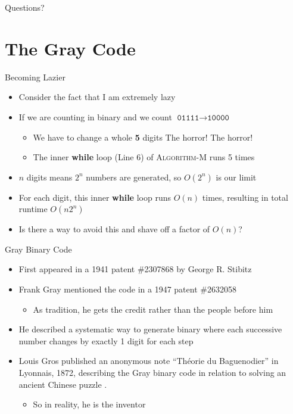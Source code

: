\documentclass[aspectratio=169]{beamer}
\begin{document}
\begin{frame}{}
      \begin{center}
    {\color{sigma@mainblue} \LARGE Questions?}
  \end{center}
\end{frame}

\section{The Gray Code}
\frame{\sectionpage}

\begin{frame}{Becoming Lazier}
    \begin{itemize}
        \item Consider the fact that I am extremely lazy \pause
        \item If we are counting in binary and we count $\texttt{01111} \to \texttt{10000}$
        \begin{itemize}
            \item We have to change a whole \textbf{5} digits \textcolor{sigma@alertred}{The horror! The horror!}
            \item The inner \textbf{while} loop (Line 6) of \textsc{Algorithm-M} runs 5 times
        \end{itemize} \pause
        \item $n$ digits means $2^n$ numbers are generated, so $O\left(2^n\right)$ is our limit \pause
        \item For each digit, this inner \textbf{while} loop runs $O(n)$ times, resulting in total runtime $O\left(n 2^n \right)$ \pause
        \item Is there a way to avoid this and shave off a factor of $O(n)$?
    \end{itemize}
\end{frame}

\begin{frame}{Gray Binary Code}
    \begin{itemize}
        \item First appeared in a 1941 patent \#2307868 by George R. Stibitz
        \item Frank Gray mentioned the code in a 1947 patent \#2632058 
        \begin{itemize}
            \item As tradition, he gets the credit rather than the people before him
        \end{itemize} \pause
        \item He described a systematic way to generate binary where each successive number changes by exactly 1 digit for each step \pause
        \item Louis Gros published an anonymous note ``Th\'eorie du Baguenodier'' in Lyonnais, 1872, describing the Gray binary code in relation to solving an ancient Chinese puzzle \cite{baugenodier}.
        \begin{itemize}
            \item So in reality, he is the inventor
        \end{itemize}
    \end{itemize}
\end{frame}
\end{document}
